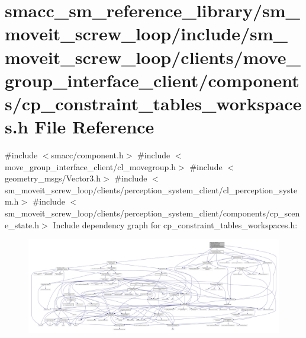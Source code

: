 \hypertarget{sm__moveit__screw__loop_2include_2sm__moveit__screw__loop_2clients_2move__group__interface__clie2fece81128f726502672145caddffcf2}{}\section{smacc\+\_\+sm\+\_\+reference\+\_\+library/sm\+\_\+moveit\+\_\+screw\+\_\+loop/include/sm\+\_\+moveit\+\_\+screw\+\_\+loop/clients/move\+\_\+group\+\_\+interface\+\_\+client/components/cp\+\_\+constraint\+\_\+tables\+\_\+workspaces.h File Reference}
\label{sm__moveit__screw__loop_2include_2sm__moveit__screw__loop_2clients_2move__group__interface__clie2fece81128f726502672145caddffcf2}
{\ttfamily \#include $<$smacc/component.\+h$>$}\newline
{\ttfamily \#include $<$move\+\_\+group\+\_\+interface\+\_\+client/cl\+\_\+movegroup.\+h$>$}\newline
{\ttfamily \#include $<$geometry\+\_\+msgs/\+Vector3.\+h$>$}\newline
{\ttfamily \#include $<$sm\+\_\+moveit\+\_\+screw\+\_\+loop/clients/perception\+\_\+system\+\_\+client/cl\+\_\+perception\+\_\+system.\+h$>$}\newline
{\ttfamily \#include $<$sm\+\_\+moveit\+\_\+screw\+\_\+loop/clients/perception\+\_\+system\+\_\+client/components/cp\+\_\+scene\+\_\+state.\+h$>$}\newline
Include dependency graph for cp\+\_\+constraint\+\_\+tables\+\_\+workspaces.\+h\+:
\nopagebreak
\begin{figure}[H]
\begin{center}
\leavevmode
\includegraphics[width=350pt]{sm__moveit__screw__loop_2include_2sm__moveit__screw__loop_2clients_2move__group__interface__clie76e7617eb076ee299165eb6f2e9a56e1}
\end{center}
\end{figure}
